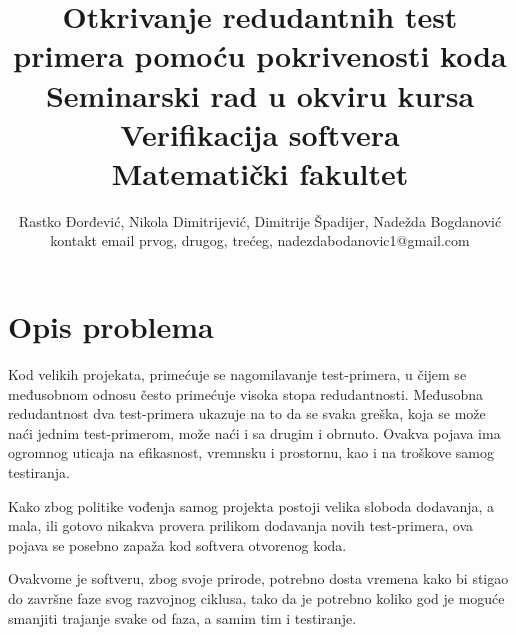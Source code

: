 \documentclass[a4paper]{article}
\theoremstyle{definition}
\begin{document}
\title{Otkrivanje redudantnih test primera pomoću pokrivenosti koda\\ \small{Seminarski rad u okviru kursa\\Verifikacija softvera\\ Matematički fakultet}}

\author{Rastko Đorđević, Nikola Dimitrijević, Dimitrije Špadijer, Nadežda Bogdanović\\ kontakt email prvog, drugog, trećeg, nadezdabodanovic1@gmail.com}


\maketitle


\tableofcontents

\newpage

\section{Opis problema}
\label{sec:opis_problema}

Kod velikih projekata, primećuje se nagomilavanje test-primera, u čijem se međusobnom odnosu često primećuje visoka stopa redudantnosti. Međusobna redudantnost dva test-primera ukazuje na to da se svaka greška, koja se može naći jednim test-primerom, može naći i sa drugim i obrnuto.
Ovakva pojava ima ogromnog uticaja na efikasnost, vremnsku i prostornu, kao i na troškove samog testiranja.

Kako zbog politike vođenja samog projekta postoji velika sloboda dodavanja, a mala, ili gotovo nikakva provera prilikom dodavanja novih test-primera, ova pojava se posebno zapaža kod softvera otvorenog koda.

Ovakvome je softveru, zbog svoje prirode, potrebno dosta vremena kako bi stigao do završne faze svog razvojnog ciklusa, tako da je potrebno koliko god je moguće smanjiti trajanje svake od faza, a samim tim i testiranje.
\end{document}
